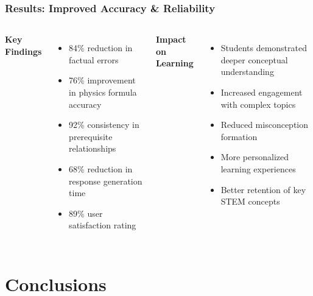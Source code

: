 \documentclass{beamer}
\begin{document}
\begin{frame}
\frametitle{Results: Improved Accuracy \& Reliability}

\begin{columns}

\textbf{Key Findings} \cite{rivera2024impact}
\begin{itemize}
    \item 84\% reduction in factual errors
    \item 76\% improvement in physics formula accuracy
    \item 92\% consistency in prerequisite relationships
    \item 68\% reduction in response generation time
    \item 89\% user satisfaction rating
\end{itemize}

\textbf{Impact on Learning} \cite{wilson2024educational}
\begin{itemize}
    \item Students demonstrated deeper conceptual understanding
    \item Increased engagement with complex topics
    \item Reduced misconception formation
    \item More personalized learning experiences
    \item Better retention of key STEM concepts
\end{itemize}

\end{columns}
\end{frame}

\section{Conclusions}
\end{document}
